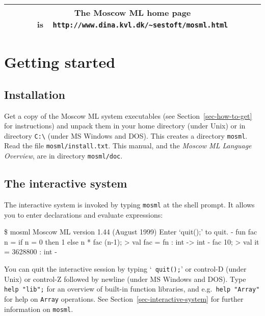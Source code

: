\documentclass[fleqn]{article}
\begin{document}
\begin{center}
\begin{tabular}{|c|}\hline
\rule[-0.4cm]{0cm}{1cm}The Moscow ML home page is\ \
    \verb$http://www.dina.kvl.dk/~sestoft/mosml.html$\\\hline
\end{tabular}
\end{center}

\vfill

\tableofcontents

\newpage

\section{Getting started}
\label{sec-getting-started}

\subsection{Installation}

Get a copy of the Moscow ML system executables (see
Section~\ref{sec-how-to-get} for instructions) and unpack them in your
home directory (under Unix) or in directory \verb#C:\# (under MS
Windows and DOS)\@.  This creates a directory {\tt mosml}.  Read the
file {\tt mosml/install.txt}.  This manual, and the {\em Moscow ML
  Language Overview\/}, are in directory {\tt mosml/doc}.


\subsection{The interactive system}

The interactive system is invoked by typing {\tt mosml} at the shell
prompt.  It allows you to enter declarations and evaluate expressions:

\begin{program}
\$ mosml
Moscow ML version 1.44 (August 1999)
Enter `quit();' to quit.
-  fun fac n = if n = 0 then 1 else n * fac (n-1);
> val fac = fn : int -> int
-  fac 10;
> val it = 3628800 : int
-
\end{program}

\noindent You can quit the interactive session by typing `{\tt
  quit();}' or control-D (under Unix) or control-Z followed by newline
(under MS Windows and DOS)\@.  Type {\tt help "lib";} for an overview
of built-in function libraries, and e.g.\ {\tt help "Array"} for help
on {\tt Array} operations.  See Section~\ref{sec-interactive-system}
for further information on {\tt mosml}.
\end{document}
